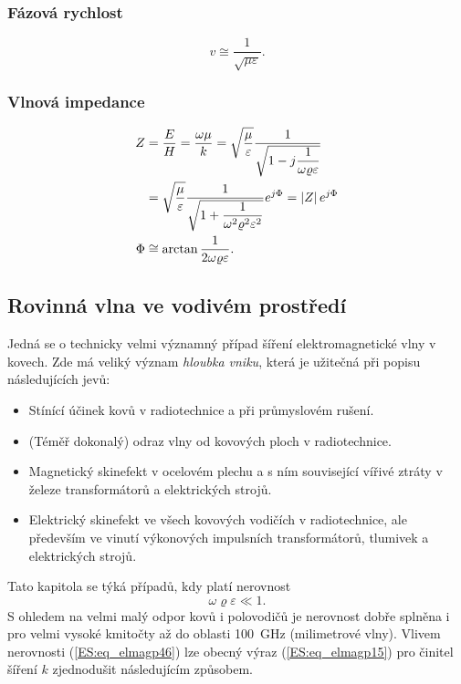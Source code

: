 {    \subsubsection{Fázová rychlost}
    \begin{equation}\label{ES:eq_elmagp45}
      v \cong \frac{1}{\sqrt{\mu\varepsilon}}.
    \end{equation}
    
    \subsubsection{Vlnová impedance}
    \begin{subequations}
      \begin{align}
           Z &= \frac{E}{H} = \frac{\omega\mu}{k} 
              = \sqrt{\frac{\mu}{\varepsilon}}                             
                     \frac{1}{\sqrt{1 - j\dfrac{1}{\omega\varrho\varepsilon}}}    \nonumber \\
             &= \sqrt{\frac{\mu}{\varepsilon}}           
                     \frac{1}{\sqrt{1 + 
                        \dfrac{1}{\omega^2\varrho^2\varepsilon^2}}}e^{j\Phi} 
              = \left\lvert Z\right\rvert e^{j\Phi}                                   \label{ES:eq_elmagp46a}  \\
        \Phi &\cong \arctan\frac{1}{2\omega\varrho\varepsilon}.    \label{ES:eq_elmagp46b}
    \end{align}
    \end{subequations}

    \subsection{Rovinná vlna ve vodivém prostředí}
      Jedná se o technicky velmi významný případ šíření elektromagnetické vlny v kovech. Zde má 
      veliký význam \emph{hloubka vniku}, která je užitečná při popisu následujících jevů:
      \begin{itemize}\addtolength{\itemsep}{-0.5\baselineskip}
        \item Stínící účinek kovů v radiotechnice a při průmyslovém rušení.
        \item (Téměř dokonalý) odraz vlny od kovových ploch v radiotechnice.
        \item Magnetický skinefekt v ocelovém plechu a s ním související vířivé ztráty v železe 
              transformátorů a elektrických strojů.
        \item Elektrický skinefekt ve všech kovových vodičích v radiotechnice, ale především ve 
              vinutí výkonových impulsních transformátorů, tlumivek a elektrických strojů.
     \end{itemize}
     Tato kapitola se týká případů, kdy platí nerovnost
     \begin{equation}\label{ES:eq_elmagp46}
       \omega\varrho\varepsilon \ll 1.
     \end{equation}
     S ohledem na velmi malý odpor kovů i polovodičů je nerovnost dobře splněna i pro velmi 
     vysoké kmitočty až do oblasti \SI{100}{\GHz} (milimetrové vlny). Vlivem nerovnosti 
     (\ref{ES:eq_elmagp46}) lze obecný výraz (\ref{ES:eq_elmagp15}) pro činitel šíření \(k\) 
     zjednodušit následujícím způsobem.
     
}
